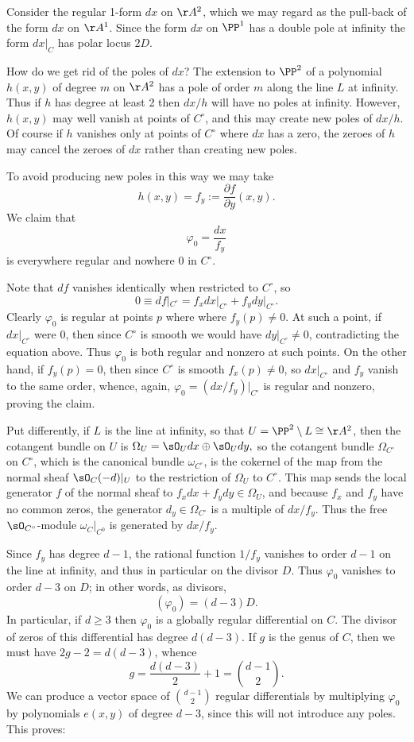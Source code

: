 Consider the
regular 1-form $dx$ on $\AA^2$, which we may regard as the pull-back of the form $dx$ on
 $\AA^{1}$.
Since the form $dx$ on $\PP^{1}$ has a double pole at infinity the form $dx|_{C}$ has polar
locus $2D$.
 
 \def\Co{{C^{\circ}}}
How do we get rid of the poles of $dx$? The extension to $\PP^2$ of a polynomial $h(x,y)$ of degree $m$ on
$\AA^2$ has a pole of order $m$ along the line $L$ at infinity. Thus if $h$ has degree at least 2 then $dx/h$ will have no poles at infinity. However, $h(x,y)$ may well vanish at points of $\Co$, and this may create new poles of $dx/h$. Of course if $h$ vanishes only at  points of $\Co$ where $dx$ has a zero, the zeroes of $h$ may cancel the zeroes of $dx$ rather than creating new poles.
 
 To avoid producing new poles in this way we may take
 $$
 h(x,y) = f_{y} := \frac{\partial f}{\partial y}(x,y).
 $$
 We claim that 
 $$
\varphi_0 = \frac{dx}{f_{y}}
$$
is everywhere regular and nowhere 0 in $C^\circ$. 

Note that $df$ vanishes identically when restricted to $C^\circ$, so
 $$
 0 \equiv df|_{\Co} = f_{x}dx|_{\Co} + f_{y}dy|_{\Co} .
 $$
Clearly $\varphi_0$ is regular at points $p$ where
where $f_{y}(p) \neq 0$. At such a point, if $dx|_{\Co}$ were 0, then since $\Co$ is smooth we would have $dy|_{\Co} \neq 0$, contradicting the equation above. Thus $\varphi_{0}$ is both regular and nonzero at such points. On the other hand, if $f_{y}(p) = 0$, then since $\Co$ is smooth $f_{x}(p) \neq 0$, so $dx|_{\Co}$ and $f_{y}$ vanish to the same
order, whence, again, $\varphi_0 = (dx/f_{y})|_{\Co}$ is regular and nonzero, proving the claim.

Put differently, if $L$ is the line at infinity, so that $U = \PP^{2}\setminus L \cong \AA^{2}$,
then the cotangent bundle on $U$ is 
$\Omega_{U}=\sO_{U}dx \oplus \sO_{U}dy,$
so 
the cotangent bundle $\Omega_{\Co}$ on $C^{\circ}$, which is the canonical bundle $\omega_{\Co}$,
 is the cokernel of the map from the normal sheaf $\sO_{C}(-d)|_{U}$ to the restriction of 
$\Omega_{U}$ to $C^{\circ}$. This map sends the local generator $f$ of the normal sheaf to
$f_{x}dx+f_{y}dy \in \Omega_{U}$, and because $f_{x}$ and $f_{y}$ have no common zeros, the generator $d_{y} \in \Omega_{C^{\circ}}$ is a multiple of $dx/f_{y}$.
Thus the free $\sO_{C^{\circ}}$-module $\omega_{C}|_{C^{0}}$ is generated by $dx/f_{y}$.

Since $f_{y}$ has degree $d-1$, the rational function $1/f_{y}$ vanishes to order $d-1$ on the line
at infinity, and thus in particular on the divisor $D$. Thus $\varphi_0$ vanishes to order $d-3$ on $D$; in other words, as divisors,
$$
(\varphi_0) = (d-3)D.
$$
In particular, if $d \geq 3$ then $\varphi_0$ is a globally regular differential on $C$. The divisor of
zeros of this differential has degree $d(d-3)$. If $g$ is the genus of $C$, then we must
have $2g-2 = d(d-3)$, whence 
$$
g = \frac{d(d-3)}{2} + 1 = \binom{d-1}{2}.
$$
We can produce a vector space of $\binom{d-1}{2}$ regular differentials by multiplying $\varphi_0$ by 
polynomials $e(x,y)$ 
  of degree $d-3$, since this will not introduce any poles. This proves:

